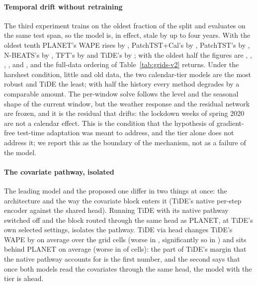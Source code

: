 \paragraph{Temporal drift without retraining} The third experiment trains on the oldest
fraction of the split and evaluates on the same test span, so the model is, in effect, stale
by up to four years. With the oldest tenth PLANET's WAPE rises by
, PatchTST+Cal's by
, PatchTST's by
, N-BEATS's by
, TFT's by
 and TiDE's by
; with the oldest half the figures are
, ,
,
, 
and , and the full-data ordering of
Table~\ref{tab:grids-v2} returns. Under the harshest condition, little and old data, the two
calendar-tier models are the most robust and TiDE the least; with half the history every
method degrades by a comparable amount. The per-window solve follows the level and the
seasonal shape of the current window, but the weather response and the residual network are
frozen, and it is the residual that drifts: the lockdown weeks of spring 2020 are not a
calendar effect. This is the condition that the hypothesis of gradient-free test-time
adaptation was meant to address, and the tier alone does not address it; we report this as the
boundary of the mechanism, not as a failure of the model.

\paragraph{The covariate pathway, isolated} The leading model and the proposed one differ in
two things at once: the architecture and the way the covariate block enters it (TiDE's native
per-step encoder against the shared head). Running TiDE with its native pathway switched off and
the block routed through the same head as PLANET, at TiDE's own selected settings, isolates the
pathway. TiDE via head changes TiDE's WAPE by  on
average over the  grid cells (worse in
, significantly so in ) and sits  behind PLANET on average (worse in
 of  cells): the
part of TiDE's margin that the native pathway accounts for is the first number, and the second
says that once both models read the covariates through the same head, the model with the tier
is ahead.

